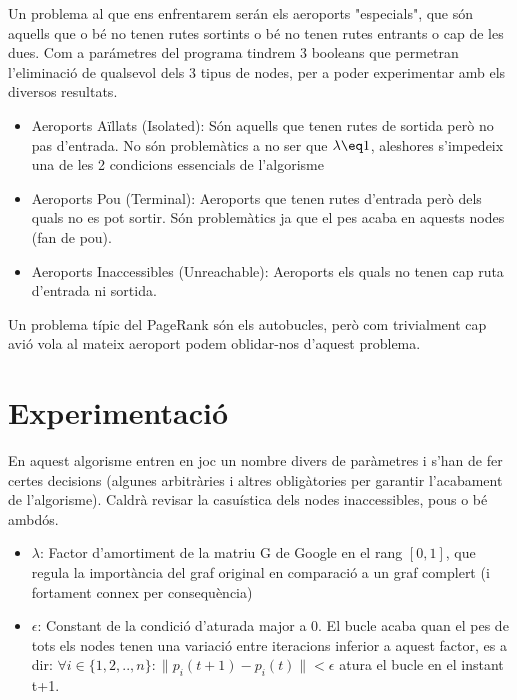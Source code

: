 \documentclass[12pt]{article}
\begin{document}
Un problema al que ens enfrentarem serán els aeroports "especials", que són aquells que o bé no tenen rutes sortints o bé no tenen rutes entrants o cap de les dues. Com a parámetres del programa tindrem 3 booleans que permetran l'eliminació de qualsevol dels 3 tipus de nodes, per a poder experimentar amb els diversos resultats.
\\ 

\begin{itemize}
    \item Aeroports Aïllats (Isolated): Són aquells que tenen rutes de sortida però no pas d'entrada. No són problemàtics a no ser que $\lambda \eq 1$, aleshores s'impedeix una de les 2 condicions essencials de l'algorisme
    \item Aeroports Pou (Terminal): Aeroports que tenen rutes d'entrada però dels quals no es pot sortir. Són problemàtics ja que el pes acaba en aquests nodes (fan de pou). 
    \item Aeroports Inaccessibles (Unreachable): Aeroports els quals no tenen cap ruta d'entrada ni sortida. 
\end{itemize}

Un problema típic del PageRank són els autobucles, però com trivialment cap avió vola al mateix aeroport podem oblidar-nos d'aquest problema.

\section{Experimentació}
En aquest algorisme entren en joc un nombre divers de paràmetres i s'han de fer certes decisions (algunes arbitràries i altres obligàtories per garantir l'acabament de l'algorisme). Caldrà revisar la casuística dels nodes inaccessibles, pous o bé ambdós.
\\

\begin{itemize}
    \item $\lambda$: Factor d'amortiment de la matriu G de Google en el rang $[0, 1]$, que regula la importància del graf original en comparació a un graf complert (i fortament connex per consequència)
    \item $\epsilon$: Constant de la condició d'aturada major a 0. El bucle acaba quan el pes de tots els nodes tenen una variació entre iteracions inferior a aquest factor, es a dir: $\forall i \in \{1,2,..,n\} : \| p_{i}(t+1) - p_{i}(t) \| < \epsilon $ atura el bucle en el instant t+1. 
\end{itemize}
\end{document}
